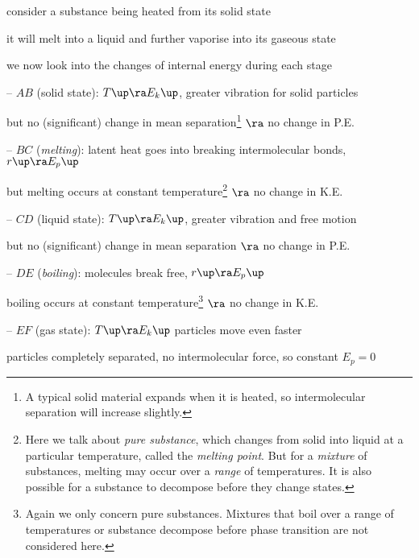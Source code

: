 consider a substance being heated from its solid state

it will melt into a liquid and further vaporise into its gaseous state

we now look into the changes of internal energy during each stage

\begin{figure}[ht]
\centering
{}
\end{figure}


\begin{compactitem}
\item[--] $AB$ (solid state): $T \up \ra E_k \up$, greater vibration for solid particles

but no (significant) change in mean separation\footnote{A typical solid material expands when it is heated, so intermolecular separation will increase slightly.} $\ra$ no change in P.E.

\item[--] $BC$ (\emph{melting}): latent heat goes into breaking intermolecular bonds, $r\up \ra E_p \up$

but melting occurs at constant temperature\footnote{Here we talk about \emph{pure substance}, which changes from solid into liquid at a particular temperature, called the \emph{melting point}. But for a \emph{mixture} of substances, melting may occur over a \emph{range} of temperatures. It is also possible for a substance to decompose before they change states.} $\ra$ no change in K.E.

\item[--] $CD$ (liquid state): $T \up \ra E_k \up$, greater vibration and free motion

but no (significant) change in mean separation $\ra$ no change in P.E.

\item[--] $DE$ (\emph{boiling}): molecules break free, $r\up \ra E_p \up$

boiling occurs at constant temperature\footnote{Again we only concern pure substances. Mixtures that boil over a range of temperatures or substance decompose before phase transition are not considered here.} $\ra$ no change in K.E.

\item[--] $EF$ (gas state): $T \up \ra E_k \up$ particles move even faster

particles completely separated, no intermolecular force, so constant $E_p = 0$
\end{compactitem}

